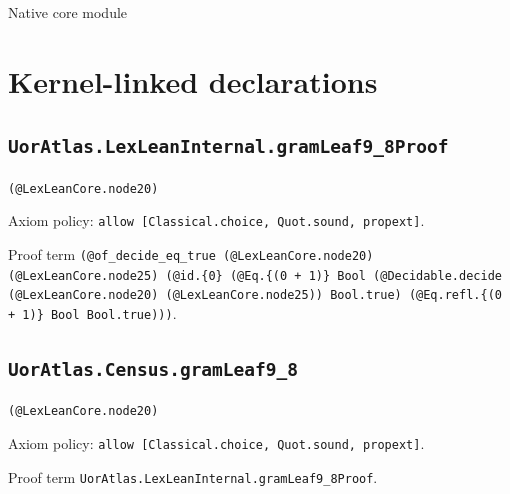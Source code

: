 \documentclass[11pt]{article}
\begin{document}
\begin{center}{\LARGE Native core module}\end{center}
\section*{Kernel-linked declarations}
\subsection*{\texttt{UorAtlas.LexLeanInternal.gramLeaf9\_8Proof}}
\noindent\texttt{(@LexLeanCore.node20)}\par
\noindent Axiom policy: \texttt{allow [Classical.choice, Quot.sound, propext]}.\par
\noindent Proof term \texttt{(@of\_decide\_eq\_true (@LexLeanCore.node20) (@LexLeanCore.node25) (@id.\{0\} (@Eq.\{(0 + 1)\} Bool (@Decidable.decide (@LexLeanCore.node20) (@LexLeanCore.node25)) Bool.true) (@Eq.refl.\{(0 + 1)\} Bool Bool.true)))}.\par
\subsection*{\texttt{UorAtlas.Census.gramLeaf9\_8}}
\noindent\texttt{(@LexLeanCore.node20)}\par
\noindent Axiom policy: \texttt{allow [Classical.choice, Quot.sound, propext]}.\par
\noindent Proof term \texttt{UorAtlas.LexLeanInternal.gramLeaf9\_8Proof}.\par
\end{document}
